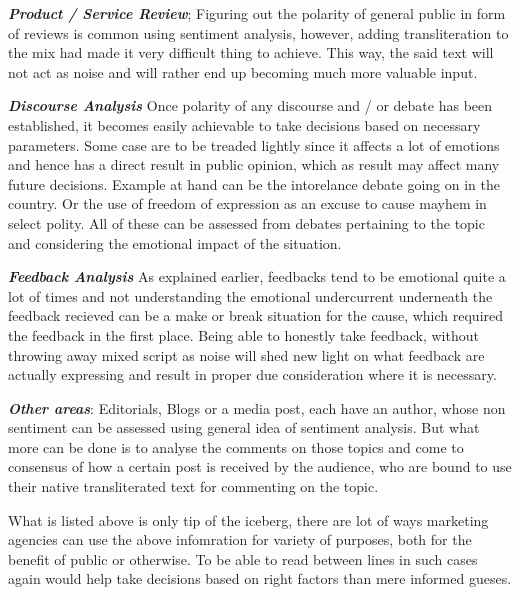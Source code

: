 \documentclass[12pt]{book}
\begin{document}
\begin{itemize*}
  \item \textbf{\textit{Product / Service Review}}; Figuring out the polarity
      of general public in form of reviews is common using sentiment analysis,
      however, adding transliteration to the mix had made it very difficult
      thing to achieve. This way, the said text will not act as noise and will
      rather end up becoming much more valuable input.\\
  \item \textbf{\textit{Discourse Analysis}} Once polarity of any discourse and
      / or debate has been established, it becomes easily achievable to take
      decisions based on necessary parameters. Some case are to be treaded
      lightly since it affects a lot of emotions and hence has a direct result
      in public opinion, which as result may affect many future decisions.
      Example at hand can be the intorelance debate going on in the country. Or
      the use of freedom of expression as an excuse to cause mayhem in select
      polity. All of these can be assessed from debates pertaining to the topic
      and considering the emotional impact of the situation.\\
  \item \textbf{\textit{Feedback Analysis}} As explained earlier, feedbacks
      tend to be emotional quite a lot of times and not understanding the
      emotional undercurrent underneath the feedback recieved can be a make or
      break situation for the cause, which required the feedback in the first
      place. Being able to honestly take feedback, without throwing away mixed
      script as noise will shed new light on what feedback are actually
      expressing and result in proper due consideration where it is necessary.\\
  \item \textbf{\textit{Other areas}}: Editorials, Blogs or a media post, each
      have an author, whose non sentiment can be assessed using general idea of
      sentiment analysis. But what more can be done is to analyse the comments
      on those topics and come to consensus of how a certain post is received
      by the audience, who are bound to use their native transliterated text
      for commenting on the topic. 
\end{itemize*}

What is listed above is only tip of the iceberg, there are lot of ways
marketing agencies can use the above infomration for variety of purposes, both
for the benefit of public or otherwise. To be able to read between lines in
such cases again would help take decisions based on right factors than mere
informed gueses.
\end{document}

